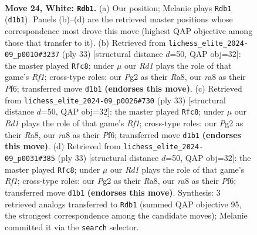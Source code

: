 \documentclass[11pt]{article}
\begin{document}
\clearpage

\begin{figure}[p]\centering
\begin{subfigure}{0.46\textwidth}\centering
\resizebox{\linewidth}{!}{%
\newchessgame
\chessboard[
  setfen={r4knr/p5pp/2p2b2/5B2/5B2/5P1P/PPP3P1/R2R2K1 w - - 1 24},
  showmover=false,
  pgfstyle=straightmove, color=movearrow, markmove={d1-b1}
]}
\caption{}
\end{subfigure}\hfill
\begin{subfigure}{0.46\textwidth}\centering
\resizebox{\linewidth}{!}{%
\newchessgame
\chessboard[
  setfen={r4rk1/pp3p2/5p1p/4pb2/2B5/4P3/PP3PPP/2R1K2R b K - 2 17},
  showmover=false,
  pgfstyle=straightmove, color=movearrow, markmove={f8-c8}
]}
\caption{}
\end{subfigure}
\\[4pt]
\begin{subfigure}{0.46\textwidth}\centering
\resizebox{\linewidth}{!}{%
\newchessgame
\chessboard[
  setfen={r4rk1/pp3p2/5p1p/4pb2/2B5/4P3/PP3PPP/2R1K2R b K - 2 17},
  showmover=false,
  pgfstyle=straightmove, color=movearrow, markmove={f8-c8}
]}
\caption{}
\end{subfigure}\hfill
\begin{subfigure}{0.46\textwidth}\centering
\resizebox{\linewidth}{!}{%
\newchessgame
\chessboard[
  setfen={r4rk1/pp3p2/5p1p/4pb2/2B5/4P3/PP3PPP/2R1K2R b K - 2 17},
  showmover=false,
  pgfstyle=straightmove, color=movearrow, markmove={f8-c8}
]}
\caption{}
\end{subfigure}
\caption{\textbf{Move 24, White: \texttt{Rdb1}.} (a) Our position; Melanie plays \texttt{Rdb1} (\texttt{d1b1}). Panels (b)--(d) are the retrieved master positions whose correspondence most drove this move (highest QAP objective among those that transfer to it). (b) Retrieved from \texttt{lichess\_elite\_2024-09\_p0010\#3237} (ply 33) [structural distance $d$=50, QAP obj=32]: the master played \texttt{Rfc8}; under $\mu$ our \emph{Rd1} plays the role of that game's \emph{Rf1}; cross-type roles: our \emph{P}g2 as their \emph{R}a8, our \emph{r}a8 as their \emph{P}f6; transferred move \texttt{d1b1} \textbf{(endorses this move)}. (c) Retrieved from \texttt{lichess\_elite\_2024-09\_p0026\#730} (ply 33) [structural distance $d$=50, QAP obj=32]: the master played \texttt{Rfc8}; under $\mu$ our \emph{Rd1} plays the role of that game's \emph{Rf1}; cross-type roles: our \emph{P}g2 as their \emph{R}a8, our \emph{r}a8 as their \emph{P}f6; transferred move \texttt{d1b1} \textbf{(endorses this move)}. (d) Retrieved from \texttt{lichess\_elite\_2024-09\_p0031\#385} (ply 33) [structural distance $d$=50, QAP obj=32]: the master played \texttt{Rfc8}; under $\mu$ our \emph{Rd1} plays the role of that game's \emph{Rf1}; cross-type roles: our \emph{P}g2 as their \emph{R}a8, our \emph{r}a8 as their \emph{P}f6; transferred move \texttt{d1b1} \textbf{(endorses this move)}. Synthesis: 3 retrieved analogs transferred to \texttt{Rdb1} (summed QAP objective 95, the strongest correspondence among the candidate moves); Melanie committed it via the \texttt{search} selector.}
\label{fig:thought-m46}
\end{figure}
\end{document}
